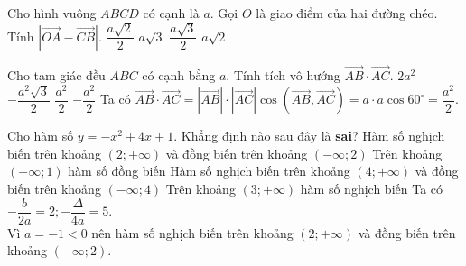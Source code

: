 \begin{ex}%
Cho hình vuông $ABCD$ có cạnh là $a$. Gọi $O$ là giao điểm của hai đường chéo. Tính $\left|\overrightarrow{OA}-\overrightarrow{CB}\right|$.
\choice
{\True $\dfrac{a\sqrt{2}}{2}$}
{$a\sqrt{3}$}
{$\dfrac{a\sqrt{3}}{2}$}
{$a\sqrt{2}$}
\loigiai
{
{}
}
\end{ex}

\begin{ex}%
Cho tam giác đều $ABC$ có cạnh bằng $a$. Tính tích vô hướng $\overrightarrow{AB}\cdot \overrightarrow{AC}$.
\choice
{$2a^2$}
{$-\dfrac{a^2\sqrt{3}}{2}$}
{\True $\dfrac{a^2}{2}$}
{$-\dfrac{a^2}{2}$}
\loigiai
{Ta có $\overrightarrow{AB}\cdot \overrightarrow{AC}=|\overrightarrow{AB}|\cdot| \overrightarrow{AC}|\cos(\overrightarrow{AB}, \overrightarrow{AC})=a\cdot a \cos60^\circ = \dfrac{a^2}{2}.$
}
\end{ex}

\begin{ex}%
Cho hàm số $y = -x^2+4x+1$. Khẳng định nào sau đây là \textbf{sai}?
\choice
{Hàm số nghịch biến trên khoảng $(2;+\infty)$ và đồng biến trên khoảng $(-\infty; 2)$}
{\True Trên khoảng $(-\infty; 1)$ hàm số đồng biến}
{Hàm số nghịch biến trên khoảng $(4; +\infty)$ và đồng biến trên khoảng $(-\infty; 4)$}
{Trên khoảng $(3;+\infty)$ hàm số nghịch biến}
\loigiai
{Ta có $-\dfrac{b}{2a}=2; -\dfrac{\Delta}{4a}=5.$\\
Vì $a =-1<0$ nên hàm số nghịch biến trên khoảng $(2;+\infty)$ và đồng biến trên khoảng $(-\infty; 2)$.
}
\end{ex}

